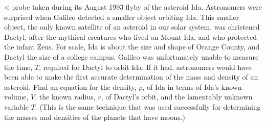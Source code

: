  <%
probe taken during its August 1993 flyby of the asteroid
Ida. Astronomers were surprised when Galileo detected a
smaller object orbiting Ida. This smaller object, the only
known satellite of an asteroid in our solar system, was
christened Dactyl, after the mythical creatures who lived on
Mount Ida, and who protected the infant Zeus. For scale, Ida
is about the size and shape of Orange County, and Dactyl the
size of a college campus. Galileo was unfortunately unable
to measure the time, $T$, required for Dactyl to orbit Ida.
If it had, astronomers would have been able to make the
first accurate determination of the mass and density of an
asteroid. Find an equation for the density, $\rho $, of Ida
in terms of Ida's known volume, $V$, the known radius, $r$,
of Dactyl's orbit, and the lamentably unknown variable $T$.
(This is the same technique that was used successfully for
determining the masses and densities of the planets that have moons.)
